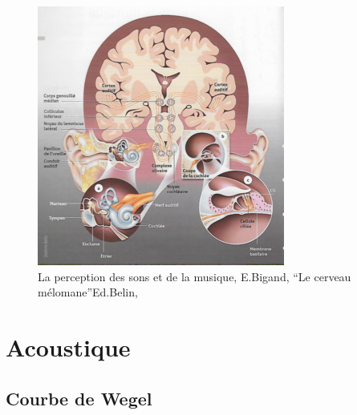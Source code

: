         \begin{figure}
	\centering
	\includegraphics[width=1\linewidth]{images/schemacerveauoreillebigand.png}
	\caption[Schéma du déroulement]{La perception des sons et de
          la musique, E.Bigand, ``Le cerveau mélomane''Ed.Belin, \autocite{bigand:cerveau}}

	\label{cerveauoreillebigand1}
\end{figure}

\section{Acoustique}

\subsection{Courbe de Wegel}
\label{acoustique}

